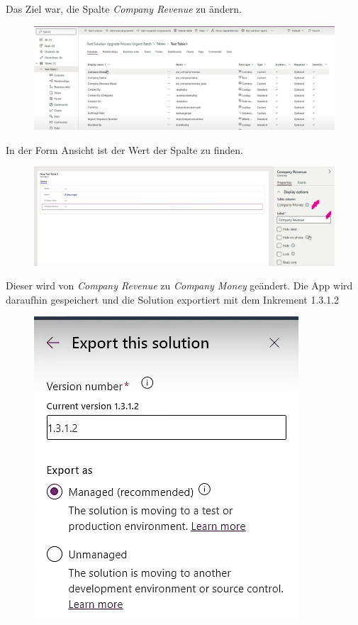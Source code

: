 Das Ziel war, die Spalte \textit{Company Revenue} zu ändern.
\begin{figure}[H]
	\centering
	\includegraphics[scale = 0.3]{attachment/chapter_13/Scc043}
\end{figure}
In der Form Ansicht ist der Wert der Spalte zu finden.
\begin{figure}[H]
	\centering
	\includegraphics[scale = 0.3]{attachment/chapter_13/Scc044}
\end{figure}
Dieser wird von \textit{Company Revenue} zu \textit{Company Money} geändert. Die App wird daraufhin gespeichert und die Solution exportiert mit dem Inkrement 1.3.1.2
\begin{figure}[H]
	\centering
	\includegraphics[scale = 0.3]{attachment/chapter_13/Scc045}
\end{figure}

